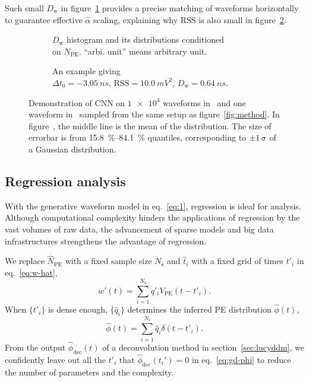 Such small $D_\mathrm{w}$ in figure~\ref{fig:cnn-npe} provides a precise matching of waveforms horizontally to guarantee effective $\hat{\alpha}$ scaling, explaining why $\mathrm{RSS}$ is also small in figure~\ref{fig:cnn}.

\begin{figure}[H]
  \begin{subfigure}{.5\textwidth}
    \centering
    \resizebox{\textwidth}{!}{}
    \caption{\label{fig:cnn-npe} $D_\mathrm{w}$ histogram and its distributions conditioned \\ on $N_{\mathrm{PE}}$. ``arbi. unit'' means arbitrary unit.}
  \end{subfigure}
  \begin{subfigure}{.5\textwidth}
    \centering
    \resizebox{\textwidth}{!}{}
    \caption{\label{fig:cnn}An example giving \\ $\Delta t_0=\SI{-3.05}{ns}$, $\mathrm{RSS}=\SI{10.0}{mV^2}$, $D_\mathrm{w}=\SI{0.64}{ns}$.}
  \end{subfigure}
  \caption{\label{fig:cnn-performance}Demonstration of CNN on $\num[retain-unity-mantissa=false]{1e4}$ waveforms in~ and one waveform in~ sampled from the same setup as figure~\ref{fig:method}. In figure~, the middle line is the mean of the distribution. The size of errorbar is from \SIrange{15.8}{84.1}{\percent} quantiles, corresponding to $\SI{\pm 1}{\sigma}$ of a Gaussian distribution. }
\end{figure}

\subsection{Regression analysis}
\label{sec:regression}
With the generative waveform model in eq.~\eqref{eq:1}, regression is ideal for analysis. Although computational complexity hinders the applications of regression by the vast volumes of raw data, the advancement of sparse models and big data infrastructures strengthens the advantage of regression.

We replace $\hat{N}_\mathrm{PE}$ with a fixed sample size $N_\mathrm{s}$ and $\hat{t}_i$ with a fixed grid of times $t'_i$ in eq.~\eqref{eq:w-hat}, 
\begin{equation}
  \label{eq:gd}
  w'(t) = \sum_{i=1}^{N_\mathrm{s}}q'_iV_\mathrm{PE}(t-t'_i).
\end{equation}
When $\{t'_i\}$ is dense enough, $\{\hat{q}_i\}$ determines the inferred PE distribution $\hat{\phi}(t)$,
\begin{equation}
  \label{eq:gd-phi}
  \hat{\phi}(t) = \sum_{i=1}^{N_\mathrm{s}}\hat{q}_i\delta(t-t'_i).
\end{equation}
From the output $\hat{\phi}_\mathrm{dec}(t)$ of a deconvolution method in section~\ref{sec:lucyddm}, we confidently leave out all the $t'_i$ that $\hat{\phi}_\mathrm{dec}(t_i')=0$ in eq.~\eqref{eq:gd-phi} to reduce the number of parameters and the complexity.


